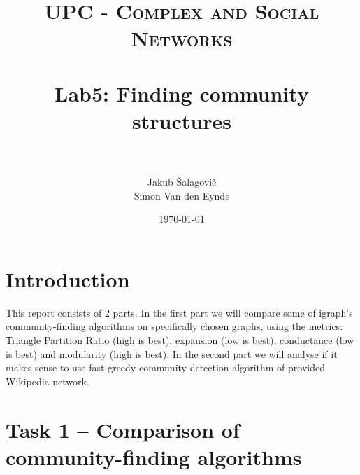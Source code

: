 \documentclass[paper=a4, fontsize=11pt]{scrartcl} %
\title{
\normalfont \normalsize
\textsc{UPC - Complex and Social Networks} \\ [25pt] %
\horrule{0.5pt} \\[0.4cm] %
\huge Lab5: Finding community structures \\ %
\horrule{2pt} \\[0.5cm] %
}
\author{Jakub Šalagovič\\Simon Van den Eynde} %
\date{\normalsize\today} %
\begin{document}
\maketitle %



\section{Introduction}
This report consists of $2$ parts. In the first part we will compare some of igraph's community-finding algorithms on specifically chosen graphs, using the metrics: Triangle Partition Ratio (high is best), expansion (low is best), conductance (low is best) and modularity (high is best). In the second part we will analyse if it makes sense to use fast-greedy community detection algorithm of provided Wikipedia network. 
\section{Task 1 -- Comparison of community-finding algorithms}
\end{document}
